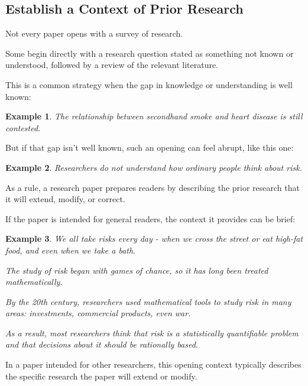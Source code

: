 \documentclass[oneside]{book}
\numberwithin{equation}{section}
\newtheorem{example}{Example}[section]
\begin{document}
\subsection{Establish a Context of Prior Research}
Not every paper opens with a survey of research.

Some begin directly with a research question stated as something not known or understood, followed by a review of the relevant literature.

This is a common strategy when the gap in knowledge or understanding is well known:
\begin{example}
    The relationship between secondhand smoke and heart disease is still contested.
\end{example}
But if that gap isn't well known, such an opening can feel abrupt, like this one:
\begin{example}
    Researchers do not understand how ordinary people think about risk.
\end{example}
%
As a rule, a research paper prepares readers by describing the prior research that it will extend, modify, or correct.

If the paper is intended for general readers, the context it provides can be brief:
\begin{example}
    We all take risks every day - when we cross the street or eat high-fat food, and even when we take a bath.
    
    The study of risk began with games of chance, so it has long been treated mathematically.
    
    By the 20th century, researchers used mathematical tools to study risk in many areas: investments, commercial products, even war.
    
    As a result, most researchers think that risk is a statistically quantifiable problem and that decisions about it should be rationally based.
\end{example}
In a paper intended for other researchers, this opening context typically describes the specific research the paper will extend or modify.
\end{document}
